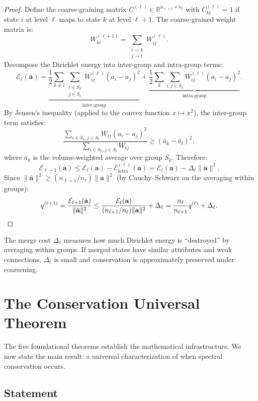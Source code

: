 \documentclass[12pt,letterpaper]{article}
\newcommand{\R}{\mathbb{R}}
\newcommand{\bfa}{\mathbf{a}}
\newcommand{\cE}{\mathcal{E}}
\begin{document}
\begin{proof}
Define the coarse-graining matrix $C^{(\ell)} \in \R^{n_{\ell+1} \times n_\ell}$ with $C^{(\ell)}_{ki} = 1$ if state $i$ at level $\ell$ maps to state $k$ at level $\ell+1$. The coarse-grained weight matrix is:
\[
  W^{(\ell+1)}_{kl} = \sum_{\substack{i \to k \\ j \to l}} W^{(\ell)}_{ij}.
\]
Decompose the Dirichlet energy into inter-group and intra-group terms:
\[
  \cE_\ell(\bfa) = \underbrace{\frac{1}{2}\sum_{k \neq l} \sum_{\substack{i \in S_k \\ j \in S_l}} W^{(\ell)}_{ij}(a_i - a_j)^2}_{\text{inter-group}} + \underbrace{\frac{1}{2}\sum_{k}\sum_{i,j \in S_k} W^{(\ell)}_{ij}(a_i - a_j)^2}_{\text{intra-group}}.
\]
By Jensen's inequality (applied to the convex function $x \mapsto x^2$), the inter-group term satisfies:
\[
  \frac{\sum_{i \in S_k, j \in S_l} W_{ij}(a_i - a_j)^2}{\sum_{i \in S_k, j \in S_l} W_{ij}} \geq (\bar{a}_k - \bar{a}_l)^2,
\]
where $\bar{a}_k$ is the volume-weighted average over group $S_k$. Therefore:
\[
  \cE_{\ell+1}(\bar{\bfa}) \leq \cE_\ell(\bfa) - \cE_{\text{intra}}^{(\ell)}(\bfa) = \cE_\ell(\bfa) - \Delta_\ell \|\bfa\|^2.
\]
Since $\|\bar{\bfa}\|^2 \geq (n_{\ell+1}/n_\ell)\|\bfa\|^2$ (by Cauchy--Schwarz on the averaging within groups):
\[
  q^{(\ell+1)} = \frac{\cE_{\ell+1}(\bar{\bfa})}{\|\bar{\bfa}\|^2} \leq \frac{\cE_\ell(\bfa)}{(n_{\ell+1}/n_\ell)\|\bfa\|^2} + \Delta_\ell = \frac{n_\ell}{n_{\ell+1}} q^{(\ell)} + \Delta_\ell. \qedhere
\]
\end{proof}

The merge cost $\Delta_\ell$ measures how much Dirichlet energy is ``destroyed'' by averaging within groups. If merged states have similar attributes and weak connections, $\Delta_\ell$ is small and conservation is approximately preserved under coarsening.

\section{The Conservation Universal Theorem}
\label{sec:universal}

The five foundational theorems establish the mathematical infrastructure. We now state the main result: a universal characterization of when spectral conservation occurs.

\subsection{Statement}
\end{document}

